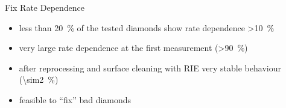 \begin{frame}{Fix Rate Dependence}

	
	\begin{itemize}\itemfill
		\item less than \SI{20}{\%} of the tested diamonds show rate dependence \SI{>10}{\%}
		\item very large rate dependence at the first measurement (\SI{>90}{\%})
		\item after reprocessing and surface cleaning with RIE very stable behaviour (\SI{\sim2}{\%})
		\item feasible to ``fix'' bad diamonds
	\end{itemize}

\end{frame}
